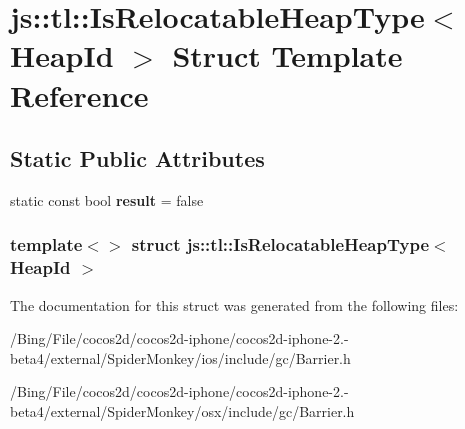 \hypertarget{structjs_1_1tl_1_1_is_relocatable_heap_type_3_01_heap_id_01_4}{\section{js\-:\-:tl\-:\-:Is\-Relocatable\-Heap\-Type$<$ Heap\-Id $>$ Struct Template Reference}
\label{structjs_1_1tl_1_1_is_relocatable_heap_type_3_01_heap_id_01_4}
}
\subsection*{Static Public Attributes}
\begin{DoxyCompactItemize}
\item 
\hypertarget{structjs_1_1tl_1_1_is_relocatable_heap_type_3_01_heap_id_01_4_ac2815ba00afa2d39875382704414b6cc}{static const bool {\bfseries result} = false}\label{structjs_1_1tl_1_1_is_relocatable_heap_type_3_01_heap_id_01_4_ac2815ba00afa2d39875382704414b6cc}

\end{DoxyCompactItemize}
\subsubsection*{template$<$$>$ struct js\-::tl\-::\-Is\-Relocatable\-Heap\-Type$<$ Heap\-Id $>$}



The documentation for this struct was generated from the following files\-:\begin{DoxyCompactItemize}
\item 
/\-Bing/\-File/cocos2d/cocos2d-\/iphone/cocos2d-\/iphone-\/2.-\/beta4/external/\-Spider\-Monkey/ios/include/gc/Barrier.\-h\item 
/\-Bing/\-File/cocos2d/cocos2d-\/iphone/cocos2d-\/iphone-\/2.-\/beta4/external/\-Spider\-Monkey/osx/include/gc/Barrier.\-h\end{DoxyCompactItemize}
